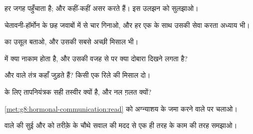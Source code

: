 \begin{exercise}[$\star$]\label{exo:g8:hormonal-communication:2}
 हर जगह पहुँचाता है; और  कहीं-कहीं असर करते हैं। इस उलझन को
सुलझाओ।
\end{exercise}

\begin{exercise}[$\star$]\label{exo:g8:hormonal-communication:3}
चेतावनी-हॉर्मोन के छह जवाबों में से चार गिनाओ, और हर एक के साथ उसकी सेवा
करता अध्याय भी।
\end{exercise}

\begin{exercise}[$\star$]\label{exo:g8:hormonal-communication:4}
 का उसूल बताओ, और उसकी सबसे अच्छी मिसाल भी।
\end{exercise}

\begin{exercise}[$\star$]\label{exo:g8:hormonal-communication:5}
 में क्या नाकाम होता है, और उसकी वजह से  पर क्या दोबारा
दिखने लगता है?
\end{exercise}

\begin{exercise}[$\star$]\label{exo:g8:hormonal-communication:6}
 और  वाले तंत्र कहाँ जुड़ते हैं? किसी एक रिले की मिसाल
दो।
\end{exercise}

\begin{exercise}[$\star\star$]\label{exo:g8:hormonal-communication:7}
 के लिए तापनियंत्रक सही तस्वीर क्यों है, और नल ग़लत क्यों?
\end{exercise}

\begin{exercise}[$\star\star$]\label{exo:g8:hormonal-communication:8}
\cref{met:g8:hormonal-communication:read} को अग्न्याशय के जमा करने वाले
 पर चलाओ।
\end{exercise}

\begin{exercise}[$\star\star$]\label{exo:g8:hormonal-communication:9}
 वाले की सुई और  को तरीक़े के चौथे सवाल की मदद से
एक ही तरह के काम की तरह समझाओ।
\end{exercise}

